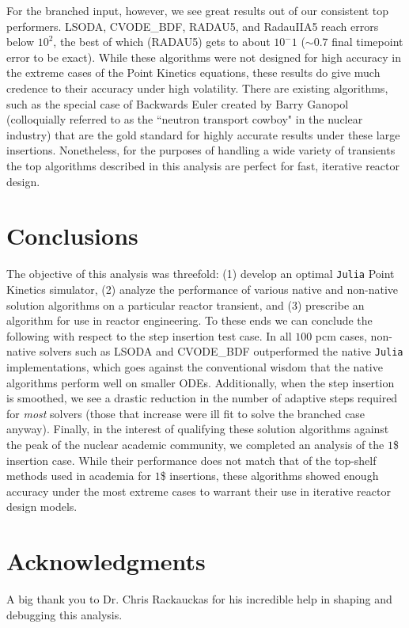 \documentclass[review,onefignum,onetabnum]{siamart171218}
\begin{document}
For the branched input, however, we see great results out of our consistent top
performers. LSODA, CVODE\_BDF, RADAU5, and RadauIIA5 reach errors below $10^2$,
the best of which (RADAU5) gets to about $10^-1$ ($\sim 0.7$ final timepoint
error to be exact). While these algorithms were not designed for high accuracy in the
extreme cases of the Point Kinetics equations, these results do give much credence
to their accuracy under high volatility. There are existing algorithms, such as the
special case of Backwards Euler created by Barry Ganopol (colloquially referred to as
the ``neutron transport cowboy" in the nuclear industry)
that are the gold standard for highly accurate results under these
large insertions. \cite{Ganopol_accurate} Nonetheless, for the purposes of handling
a wide variety of transients the top algorithms described in this analysis are
perfect for fast, iterative reactor design.

\section{Conclusions}
The objective of this analysis was threefold: (1) develop an optimal \texttt{Julia}
Point Kinetics simulator, (2) analyze the performance of various native and non-native
solution algorithms on a particular reactor transient, and (3) prescribe an algorithm
for use in reactor engineering. To these ends we can conclude the following with respect
to the step insertion test case. In all $100$ pcm cases, non-native solvers such as LSODA and
CVODE\_BDF outperformed the native \texttt{Julia} implementations, which goes
against the conventional wisdom that the native algorithms perform well on smaller
ODEs. Additionally, when the step insertion is smoothed, we see a drastic reduction in the number of adaptive
steps required for \emph{most} solvers (those that increase were ill fit to solve the
branched case anyway). Finally, in the interest of qualifying these solution algorithms
against the peak of the nuclear academic community, we completed an analysis of the $1$\$
insertion case. While their performance does not match that of the top-shelf methods
used in academia for $1$\$ insertions, these algorithms showed enough accuracy under the
most extreme cases to warrant their use in iterative reactor design models.

\section*{Acknowledgments}
A big thank you to Dr. Chris Rackauckas for his incredible help in shaping and debugging
this analysis.



\end{document}
